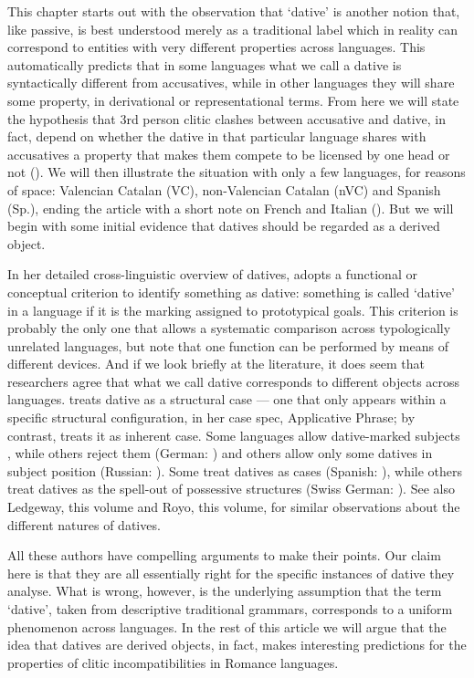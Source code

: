 \documentclass[output=paper,colorlinks,citecolor=brown]{./langscibook}
\begin{document}
This chapter starts out with the observation that ‘dative’ is another notion that, like passive, is best understood merely as a traditional label which in reality can correspond to entities with very different properties across languages. This automatically predicts that in some languages what we call a dative is syntactically different from accusatives, while in other languages they will share some property, in derivational or representational terms. From here we will state the hypothesis that 3rd person clitic clashes between accusative and dative, in fact, depend on whether the dative in that particular language shares with accusatives a property that makes them compete to be licensed by one head or not (). We will then illustrate the situation with only a few languages, for reasons of space: Valencian Catalan (VC), non-Valencian Catalan (nVC) and Spanish (Sp.), ending the article with a short note on French and Italian (). But we will begin with some initial evidence that datives should be regarded as a derived object.

In her detailed cross-linguistic overview of datives, \citet{Næss2009} adopts a functional or conceptual criterion to identify something as dative: something is called ‘dative’ in a language if it is the marking assigned to prototypical goals. This criterion is probably the only one that allows a systematic comparison across typologically unrelated languages, but note that one function can be performed by means of different devices. And if we look briefly at the literature, it does seem that researchers agree that what we call dative corresponds to different objects across languages. \citet{Cuervo2003} treats dative as a structural case — one that only appears within a specific structural configuration, in her case spec, Applicative Phrase; by contrast, \citet{Woolford2006} treats it as inherent case. Some languages allow dative-marked subjects \citep{ZaenenMalingThráinsson1985}, while others reject them (German: \citealt{Bayer2004}) and others allow only some datives in subject position (Russian: \citealt{MoorePerlmutter2000}). Some treat datives as cases (Spanish: \citealt{OrmazabalRomero2013Probus}), while others treat datives as the spell-out of possessive structures (Swiss German: \citet{Leu2015}). See also Ledgeway, this volume and Royo, this volume, for similar observations about the different natures of datives.

All these authors have compelling arguments to make their points. Our claim here is that they are all essentially right for the specific instances of dative they analyse. What is wrong, however, is the underlying assumption that the term ‘dative’, taken from descriptive traditional grammars, corresponds to a uniform phenomenon across languages. In the rest of this article we will argue that the idea that datives are derived objects, in fact, makes interesting predictions for the properties of clitic incompatibilities in Romance languages.
\end{document}
